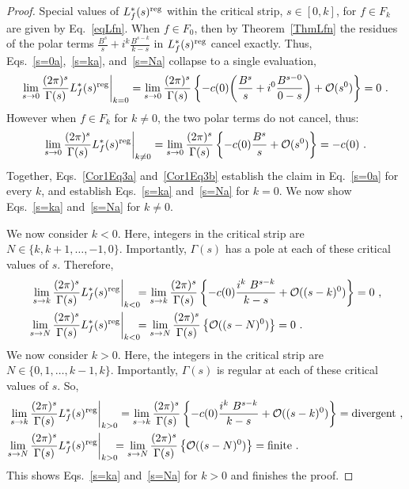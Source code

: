 \documentclass[11pt,a4paper]{article}
\newcommand{\G}{\Gamma}
\newcommand{\reg}{{\rm reg}}
\begin{document}
\begin{proof}
Special values of $L_f^*(s)^\reg$ within the critical strip, $s \in [0,k]$, for $f \in F_k$ are given by Eq.~\eqref{eqLfn}. When $f \in F_0$, then by Theorem~\ref{ThmLfn} the residues of the polar terms $\tfrac{B^s}{s} + i^k \tfrac{B^{s-k}}{k-s}$ in $L_f^*(s)^\reg$ cancel exactly. Thus, Eqs.~\eqref{s=0a},~\eqref{s=ka}, and~\eqref{s=Na} collapse to a single evaluation,
\begin{align}
\lim_{s \to 0} \frac{(2\pi)^s}{\G(s)} L_f^*(s)^\reg\bigg|_{k =0} = \lim_{s \to 0} \frac{(2 \pi)^s}{\G(s)} \left\{ -c(0) \bigg(\frac{B^s}{s} + i^0\frac{B^{s-0}}{0-s} \bigg) + {\cal O}(s^0)  \right\} = 0~.\label{Cor1Eq3a}
\end{align}
However when $f \in F_k$ for $k \neq 0$, the two polar terms do not cancel, thus:
\begin{align}
\lim_{s \to 0} \frac{(2\pi)^s}{\G(s)} L_f^*(s)^\reg\bigg|_{k \neq 0} = \lim_{s \to 0} \frac{(2 \pi)^s}{\G(s)} \left\{ -c(0) \frac{B^s}{s} + {\cal O}(s^0)  \right\} = -c(0)~.\label{Cor1Eq3b}
\end{align}
Together, Eqs.~\eqref{Cor1Eq3a} and~\eqref{Cor1Eq3b} establish the claim in Eq.~\eqref{s=0a} for every $k$, and establish Eqs.~\eqref{s=ka} and~\eqref{s=Na} for $k = 0$. We now show Eqs.~\eqref{s=ka} and~\eqref{s=Na} for $k \neq 0$.

We now consider $k < 0$. Here, integers in the critical strip are $N \in \{ k, k+1, \ldots, -1,0\}$. Importantly, $\G(s)$ has a pole at each of these critical values of $s$. Therefore, 
\begin{align}
\lim_{s \to k} \frac{(2\pi)^s}{\G(s)} L_f^*(s)^\reg\bigg|_{k < 0} 
&\!\!\!= \lim_{s \to k} \frac{(2 \pi)^s}{\G(s)} \left\{ -c(0) \frac{i^k~B^{s-k}}{k-s} + {\cal O}((s-k)^0)  \right\} = 0~,\label{Cor1Eq4a} \\
\lim_{s \to N} \frac{(2\pi)^s}{\G(s)} L_f^*(s)^\reg\bigg|_{k < 0} 
&\!\!\!= \lim_{s \to N} \frac{(2 \pi)^s}{\G(s)} \left\{ {\cal O}((s-N)^0)  \right\} = 0~.\label{Cor1Eq4b}
\end{align}
We now consider $k > 0$. Here, the integers in the critical strip are $N \in \{ 0, 1, \ldots, k-1,k\}$. Importantly, $\G(s)$ is regular at each of these critical values of $s$. So,
\begin{align}
\lim_{s \to k} \frac{(2\pi)^s}{\G(s)} L_f^*(s)^\reg\bigg|_{k > 0} 
& = \lim_{s \to k} \frac{(2 \pi)^s}{\G(s)} \left\{ -c(0) \frac{i^k~B^{s-k}}{k-s} + {\cal O}((s-k)^0)  \right\} = {\rm divergent}~,\label{Cor1Eq4a} \\
\lim_{s \to N} \frac{(2\pi)^s}{\G(s)} L_f^*(s)^\reg\bigg|_{k > 0} 
&\!\!\!= \lim_{s \to N} \frac{(2 \pi)^s}{\G(s)} \left\{ {\cal O}((s-N)^0)  \right\} = {\rm finite}~.\label{Cor1Eq4b} 
\end{align} 
This shows Eqs.~\eqref{s=ka} and~\eqref{s=Na} for $k > 0$ and finishes the proof. \end{proof}
\end{document}
